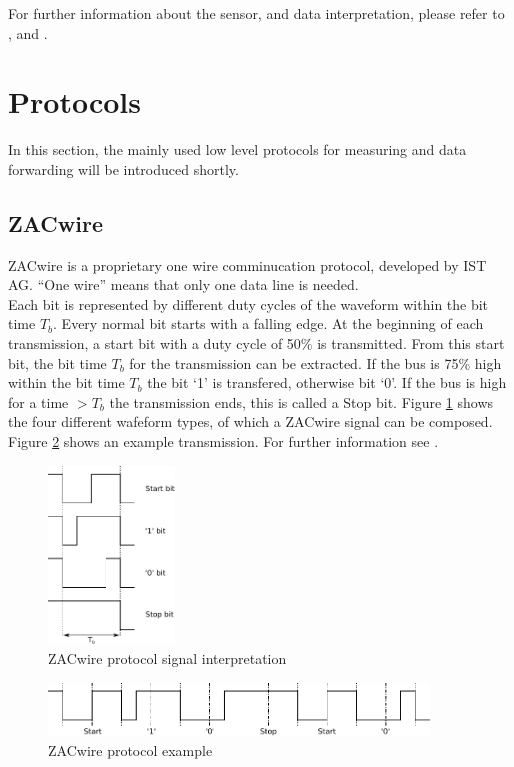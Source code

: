 \documentclass[a4paper]{scrreprt}
\begin{document}
For further information about the sensor, and data interpretation, please refer to \cite{hyt}, \cite{hyt3} and \cite{hyt2}.
\section{Protocols}
In this section, the mainly used low level protocols for measuring and data forwarding will be introduced shortly. 
\subsection{ZACwire}\label{chap:zac}
ZACwire is a proprietary one wire comminucation protocol, developed
by IST AG. ``One wire'' means that only one data line is needed.\\
Each bit is represented by
different duty cycles of the waveform within the bit time $T_b$.
Every normal bit starts with a falling edge. At the beginning
of each transmission, a start bit with a duty cycle of 50\% is
transmitted. From this start bit, the bit time $T_b$ for the
transmission can be extracted. 
If the bus is 75\% high within the bit time $T_b$ the bit `1' is transfered, otherwise bit `0'. 
If the bus is high for a time $>T_b$
the transmission ends, this is called a Stop bit. Figure \ref{fig:zac}
shows the four different wafeform types, of which a ZACwire signal can be
composed. Figure \ref{fig:zacexample} shows an example
transmission. For further information see \cite{zac}.
\begin{figure}[Hh!]
	\centering
	\includegraphics[width=0.3\textwidth]{img/zac_bits.pdf}
	\caption{ZACwire protocol signal interpretation}
	\label{fig:zac}
\end{figure}
\begin{figure}[h]
	\centering
	\includegraphics[width=0.9\textwidth]{img/zac_example.pdf}
	\caption{ZACwire protocol example}
	\label{fig:zacexample}
\end{figure}
\end{document}

